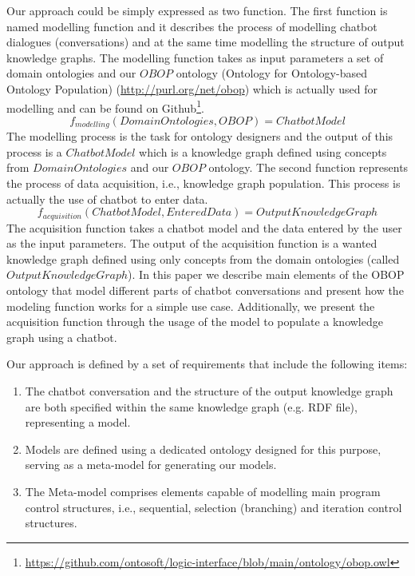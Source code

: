 \documentclass[runningheads]{llncs}
\begin{document}
Our approach could be simply expressed as two function. The first function is named modelling function and it describes the process of modelling chatbot dialogues (conversations) and at the same time modelling the structure of output knowledge graphs. The modelling function takes as input parameters a set of domain ontologies and our $OBOP$ ontology (Ontology for Ontology-based Ontology Population) (\url{http://purl.org/net/obop}) which is actually used for modelling and can be found on Github\footnote{\url{https://github.com/ontosoft/logic-interface/blob/main/ontology/obop.owl}}.
$$ f_{modelling}(DomainOntologies, OBOP) = ChatbotModel$$
The modelling process is the task for ontology designers and the output of this process is a $ChatbotModel$ which is a knowledge graph defined using concepts from $DomainOntologies$ and our $OBOP$ ontology. 
The second function represents the process of data acquisition, i.e., knowledge graph population. This process is actually the use of chatbot to enter data.
$$f_{acquisition}(ChatbotModel, EnteredData) = OutputKnowledgeGraph$$
The acquisition function takes a chatbot model and the data entered by the user as the input parameters. The output of the acquisition function is a wanted knowledge graph defined using only concepts from the domain ontologies (called $OutputKnowledgeGraph$). In this paper we describe main elements of the OBOP ontology that model different parts of chatbot conversations and present how the modeling function works for a simple use case. Additionally, we present the acquisition function through the usage of the model to populate a knowledge graph using a chatbot.      

Our approach is defined by a set of requirements that include the following items:
\begin{enumerate}
\item
  The chatbot conversation and the structure of the output knowledge graph are both specified within the same knowledge graph (e.g. RDF file), representing a model.
\item
  Models are defined using a dedicated ontology designed for this purpose, serving as a meta-model for generating our models.
\item
The Meta-model comprises elements capable of modelling main program control structures, i.e., sequential, selection (branching) and iteration control structures. 
\end{enumerate}

\end{document}

